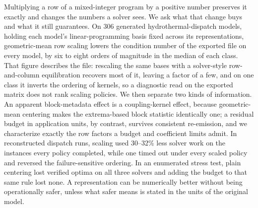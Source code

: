 Multiplying a row of a mixed-integer program by a positive number preserves it exactly and
changes the numbers a solver sees. We ask what that change buys and what it still guarantees.
On 306 generated hydrothermal-dispatch models, holding each model's linear-programming basis fixed
across its representations, geometric-mean row scaling lowers the condition number of the exported file on
every model, by six to eight orders of magnitude in the median of each class. That figure
describes the file: rescaling the same bases with a solver-style row-and-column equilibration
recovers most of it, leaving a factor of a few, and on one class it inverts the ordering of
kernels, so a diagnostic read on
the exported matrix does not rank scaling policies. We then separate two kinds of
information. An apparent block-metadata effect is a coupling-kernel effect, because
geometric-mean centering makes the extrema-based block statistic identically one; a residual
budget in application units, by contrast, survives consistent re-emission, and we characterize
exactly the row factors a budget and coefficient limits admit. In reconstructed dispatch runs, scaling used
30--32\% less solver work on the instances every policy completed, while one timed out under
every scaled policy and reversed the failure-sensitive ordering. In an enumerated stress test,
plain centering lost verified optima on all three solvers and adding the budget to that same
rule lost none. A representation can be numerically better without
being operationally safer, unless what safer means is stated in the units of the original
model.
